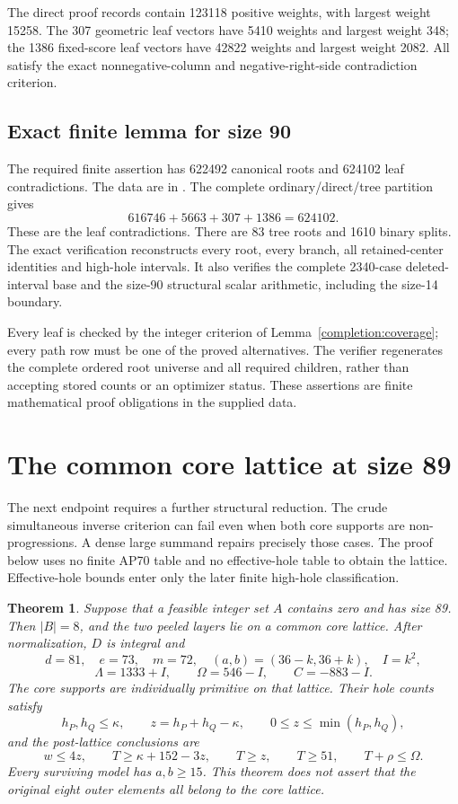 \documentclass[11pt,a4paper]{article}
\newtheorem{theorem}{Theorem}[section]
\theoremstyle{remark}
\begin{document}
The direct proof records contain 123118 positive weights, with largest
weight 15258. The 307 geometric leaf vectors have 5410 weights and
largest weight 348; the 1386 fixed-score leaf vectors have 42822 weights
and largest weight 2082. All satisfy the exact nonnegative-column and
negative-right-side contradiction criterion.


\subsection{Exact finite lemma for size 90}
\label{u86:finite:90}
The required finite assertion has 622492 canonical roots and 624102
leaf contradictions. The data are in .
The complete ordinary/direct/tree partition gives
\[616746+5663+307+1386=624102.\]
These are the leaf contradictions. There are 83 tree roots
and 1610 binary splits. The exact verification reconstructs every root,
every branch, all retained-center identities and high-hole intervals.
It also verifies the complete 2340-case deleted-interval base and the
size-90 structural scalar arithmetic, including the size-14 boundary.

Every leaf is checked by the integer criterion of
Lemma~\ref{completion:coverage}; every path row must be one of the
proved alternatives. The verifier  regenerates
the complete ordered root universe and all required children, rather than
accepting stored counts or an optimizer status. These assertions are finite
mathematical proof obligations in the supplied data.



\section{The common core lattice at size 89}\label{u86:sec:lattice89}
The next endpoint requires a further structural reduction. The crude
simultaneous inverse criterion can fail even when both core supports are
non-progressions. A dense large summand repairs precisely those cases.
The proof below uses no finite AP70 table and no effective-hole table to
obtain the lattice. Effective-hole bounds enter only the later finite
high-hole classification.

\begin{theorem}\label{u86:thm:lattice89}
Suppose that a feasible integer set $A$ contains zero and has size 89.
Then $|B|=8$, and the two peeled layers lie on a common core lattice.
After normalization, $D$ is integral and
\[
 d=81,\quad e=73,\quad m=72,\quad
 (a,b)=(36-k,36+k),\quad I=k^2,
\]
\[
 \Lambda=1333+I,\qquad \Omega=546-I,\qquad C=-883-I.
\]
The core supports are individually primitive on that lattice. Their
hole counts satisfy
\[
 h_P,h_Q\le\kappa,\qquad
 z=h_P+h_Q-\kappa,\qquad 0\le z\le\min(h_P,h_Q),
\]
and the post-lattice conclusions are
\begin{equation}\label{u86:eq:budget89}
 w\le4z,\qquad T\ge\kappa+152-3z,\qquad
 T\ge z,\qquad T\ge51,\qquad T+\rho\le\Omega.
\end{equation}
Every surviving model has $a,b\ge15$. This theorem does not assert that
the original eight outer elements all belong to the core lattice.
\end{theorem}
\end{document}
